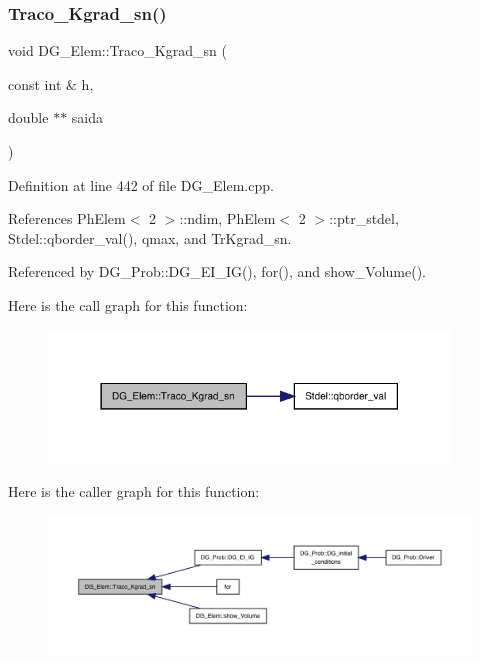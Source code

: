 \subsubsection{\texorpdfstring{Traco\+\_\+\+Kgrad\+\_\+sn()}{Traco\_Kgrad\_sn()}}
{\footnotesize\ttfamily void D\+G\+\_\+\+Elem\+::\+Traco\+\_\+\+Kgrad\+\_\+sn (\begin{DoxyParamCaption}\item[{const int \&}]{h,  }\item[{double $\ast$$\ast$}]{saida }\end{DoxyParamCaption})}



Definition at line 442 of file D\+G\+\_\+\+Elem.\+cpp.



References Ph\+Elem$<$ 2 $>$\+::ndim, Ph\+Elem$<$ 2 $>$\+::ptr\+\_\+stdel, Stdel\+::qborder\+\_\+val(), qmax, and Tr\+Kgrad\+\_\+sn.



Referenced by D\+G\+\_\+\+Prob\+::\+D\+G\+\_\+\+E\+I\+\_\+\+I\+G(), for(), and show\+\_\+\+Volume().

Here is the call graph for this function\+:
\nopagebreak
\begin{figure}[H]
\begin{center}
\leavevmode
\includegraphics[width=302pt]{classDG__Elem_ae64a1118040aad9dd3c18ac68b2d5d4f_cgraph}
\end{center}
\end{figure}
Here is the caller graph for this function\+:
\nopagebreak
\begin{figure}[H]
\begin{center}
\leavevmode
\includegraphics[width=350pt]{classDG__Elem_ae64a1118040aad9dd3c18ac68b2d5d4f_icgraph}
\end{center}
\end{figure}
\mbox{\label{classDG__Elem_aa97824992d60c2a7b5506e5d660dc7a1}} 

